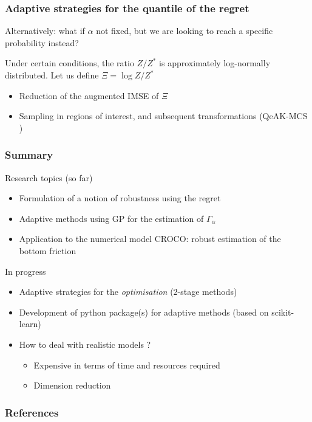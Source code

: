 \documentclass[11pt]{beamer}
\begin{document}
\begin{frame}
  \frametitle{Adaptive strategies for the quantile of the regret}
  Alternatively: what if $\alpha$ not fixed, but we are looking to reach a specific probability instead?

  
  Under certain conditions, the ratio $Z/Z^*$ is approximately
  log-normally distributed.  Let us define $\Xi = \log Z/ Z^*$

  \begin{itemize}
  \item Reduction of the augmented IMSE of $\Xi$
  \end{itemize}
  \begin{itemize}
  \item Sampling in regions of interest, and subsequent transformations (QeAK-MCS \citep{razaaly_rare_2019})
  \end{itemize}
\end{frame}

\begin{frame}
\frametitle{Summary}
\begin{block}{Research topics (so far)}
\begin{itemize}
\item Formulation of a notion of robustness using the regret
\item Adaptive methods using GP for the estimation of $\Gamma_{\alpha}$
\item Application to the numerical model CROCO: robust estimation of the bottom friction
\end{itemize}
\end{block}


\begin{block}{In progress}
\begin{itemize}
\item Adaptive strategies for the \emph{optimisation} (2-stage methods)
\item Development of python package(s) for adaptive methods (based on scikit-learn)
\item How to deal with realistic models ?
  \begin{itemize}
  \item Expensive in terms of time and resources required
  \item Dimension reduction
  \end{itemize}
\end{itemize}
\end{block}
\end{frame}
\begin{frame}[allowframebreaks]
  \renewcommand{\bibsection}{}

  \frametitle{References}


\end{frame}
\end{document}
